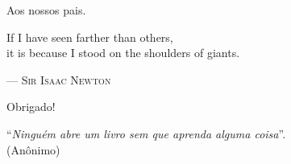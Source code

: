 \documentclass[twoside,english,brazilian]{UNISINOSmonografia}
\begin{document}
\capa
\folhaderosto

%
\begin{dedicatoria}
Aos nossos pais.\\[4ex] %
\begin{itshape} %
If I have seen farther than others,\\
it is because I stood on the shoulders of giants.\\
\end{itshape}
--- \textsc{Sir Isaac Newton} %
\end{dedicatoria}

\begin{agradecimentos}
Obrigado!
\end{agradecimentos}

%
\begin{epigrafe}
``\textit{Ninguém abre um livro sem que aprenda alguma coisa}''.\\
(Anônimo)
\end{epigrafe}

%
\begin{abstract}
Este documento apresenta orientações para uso da classe \LaTeX\ de formatação de monografias para a UNISINOS\@.  Ao mesmo tempo, ele serve como exemplo de uso da classe, demonstrando os principais comandos a serem utilizados, e outras orientações mais gerais de uso do \LaTeX.  Adicionalmente, procuramos incluir no documento algumas orientações sobre a escrita da monografia em si, reunindo dicas e recomendações que contribuem para aumentar a qualidade técnica dos trabalhos acadêmicos.  O Resumo deve conter de 150 a 500~palavras e nele não deve haver citações. Sugere-se a utilização de parágrafo único.
\end{abstract}
\end{document}

